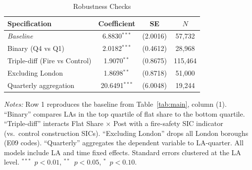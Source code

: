 \begin{table}[htbp]
\centering
\caption{Robustness Checks}
\label{tab:robustness}
\begin{tabular}{lccc}
\hline\hline
Specification & Coefficient & SE & $N$ \\
\hline
\textit{Baseline} & 6.8830$^{***}$ & (2.0016) & 57,732 \\
Binary (Q4 vs Q1) & 2.0182$^{***}$ & (0.4612) & 28,968 \\
Triple-diff (Fire vs Control) & 1.9070$^{**}$ & (0.8675) & 115,464 \\
Excluding London & 1.8698$^{**}$ & (0.8718) & 51,000 \\
Quarterly aggregation & 20.6491$^{***}$ & (6.0048) & 19,244 \\
\hline\hline
\end{tabular}
\begin{tablenotes}[flushleft]
\small
\item \textit{Notes:} Row 1 reproduces the baseline from Table~\ref{tab:main}, column (1). ``Binary'' compares LAs in the top quartile of flat share to the bottom quartile. ``Triple-diff'' interacts Flat Share $\times$ Post with a fire-safety SIC indicator (vs.\ control construction SICs). ``Excluding London'' drops all London boroughs (E09 codes). ``Quarterly'' aggregates the dependent variable to LA-quarter. All models include LA and time fixed effects. Standard errors clustered at the LA level. $^{***}$~$p<0.01$, $^{**}$~$p<0.05$, $^{*}$~$p<0.10$.
\end{tablenotes}
\end{table}
